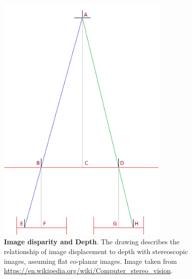 \begin{figure}
    \centering
    \includegraphics[width=0.75\textwidth]{figures/1_perception_and_sensing_in_robotics/binocular_disparity}
    \caption{\textbf{Image disparity and Depth}. The drawing describes the relationship of image displacement to depth with stereoscopic images, assuming flat co-planar images. Image taken from \url{https://en.wikipedia.org/wiki/Computer_stereo_vision}.} 
    \label{fig:binocular_disparity}
\end{figure}


